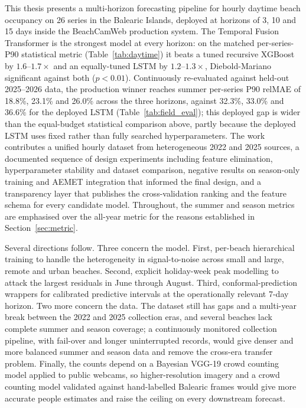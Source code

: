 \documentclass[twocolumn,twoside,a4paper,10pt]{IEEEtran}
\begin{document}
This thesis presents a multi-horizon forecasting pipeline for hourly daytime beach occupancy on 26 series in the Balearic Islands, deployed at horizons of 3, 10 and 15 days inside the BeachCamWeb production system. The Temporal Fusion Transformer is the strongest model at every horizon: on the matched per-series-P90 statistical metric (Table~\ref{tab:daytime}) it beats a tuned recursive XGBoost by $1.6$--$1.7\times$ and an equally-tuned LSTM by $1.2$--$1.3\times$, Diebold-Mariano significant against both ($p<0.01$). Continuously re-evaluated against held-out 2025--2026 data, the production winner reaches summer per-series P90 relMAE of 18.8\%, 23.1\% and 26.0\% across the three horizons, against 32.3\%, 33.0\% and 36.6\% for the deployed LSTM (Table~\ref{tab:field_eval}); this deployed gap is wider than the equal-budget statistical comparison above, partly because the deployed LSTM uses fixed rather than fully searched hyperparameters. The work contributes a unified hourly dataset from heterogeneous 2022 and 2025 sources, a documented sequence of design experiments including feature elimination, hyperparameter stability and dataset comparison, negative results on season-only training and AEMET integration that informed the final design, and a transparency layer that publishes the cross-validation ranking and the feature schema for every candidate model. Throughout, the summer and season metrics are emphasised over the all-year metric for the reasons established in Section~\ref{sec:metric}.

Several directions follow. Three concern the model. First, per-beach hierarchical training to handle the heterogeneity in signal-to-noise across small and large, remote and urban beaches. Second, explicit holiday-week peak modelling to attack the largest residuals in June through August. Third, conformal-prediction~\cite{Angelopoulos2023Conformal} wrappers for calibrated predictive intervals at the operationally relevant 7-day horizon. Two more concern the data. The dataset still has gaps and a multi-year break between the 2022 and 2025 collection eras, and several beaches lack complete summer and season coverage; a continuously monitored collection pipeline, with fail-over and longer uninterrupted records, would give denser and more balanced summer and season data and remove the cross-era transfer problem. Finally, the counts depend on a Bayesian VGG-19 crowd counting model applied to public webcams, so higher-resolution imagery and a crowd counting model validated against hand-labelled Balearic frames would give more accurate people estimates and raise the ceiling on every downstream forecast.
\end{document}
